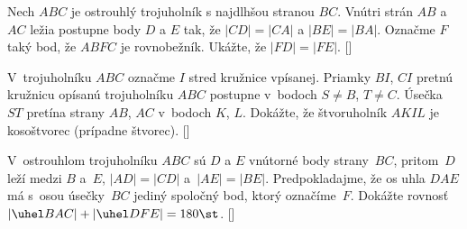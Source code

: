 {Nech $ABC$ je ostrouhlý trojuholník s najdlhšou stranou $BC$.
Vnútri strán $AB$ a $AC$
ležia postupne body $D$ a $E$ tak, že $|CD| = |CA|$ a $|BE| =
|BA|$. Označme $F$ taký bod,
že $ABFC$ je rovnobežník. Ukážte, že $|FD| = |FE|$.
[]

V~trojuholníku $ABC$ označme $I$ stred kružnice vpísanej.
Priamky $BI$, $CI$ pretnú kružnicu opísanú trojuholníku $ABC$
postupne v~bodoch $S\ne B$, $T\ne C$. Úsečka~$ST$ pretína strany
$AB$, $AC$ v~bodoch $K$, $L$. Dokážte, že štvoruholník $AKIL$ je
kosoštvorec (prípadne štvorec).
[]

V~ostrouhlom trojuholníku $ABC$ sú $D$ a $E$ vnútorné body strany~$BC$,
pritom~$D$ leží medzi $B$ a~$E$, $|AD|=|CD|$ a~$|AE|=|BE|$.
Predpokladajme, že os uhla $DAE$ má s~osou úsečky~$BC$ jediný
spoločný bod, ktorý označíme~$F$. Dokážte rovnosť
$|\uhel BAC|+|\uhel DFE|=180\st$.
[]

}

